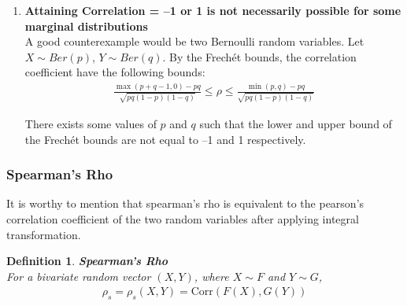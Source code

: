 \documentclass[12pt]{report}
\newtheorem{definition}{Definition}[subsection]
\newcommand{\1}{\mathbf{1}}
\begin{document}
\begin{enumerate}
\item \textbf{Attaining Correlation = --1 or 1 is not necessarily possible for some marginal distributions} \\
\vspace{0.5cm}
A good counterexample would be two Bernoulli random variables. Let $X \sim Ber(p)$, $Y \sim Ber(q)$. By the Frech{\'e}t bounds, the correlation coefficient have the following bounds: \\
\vspace{-0.8cm}
\begin{align*}
\frac{\max(p+q-1,0) - pq}{\sqrt{pq(1-p)(1-q)}} \le \rho \le \frac{\min(p,q) - pq}{\sqrt{pq(1-p)(1-q)}}
\end{align*}

There exists some values of $p$ and $q$ such that the lower and upper bound of the Frech{\'e}t bounds are not equal to --1 and 1 respectively.\\ 
\end{enumerate}

\subsubsection{Spearman's Rho}
\vspace{0.5cm}

It is worthy to mention that spearman's rho is equivalent to the pearson's correlation coefficient of the two random variables after applying integral transformation.

\begin{definition}\label{SpearmanRhoDefinition}
\textit{\normalfont\parencite{SpearmanRhoAuthor1904}}\:\textbf{Spearman's Rho}  \\
For a bivariate random vector $(X,Y)$, where $X \sim F$ and $Y \sim G$,
\begin{align*}
\rho_{s} = \rho_{s}(X,Y) = \mathrm{Corr}(F(X),G(Y))
\end{align*}
\end{definition}
\end{document}
